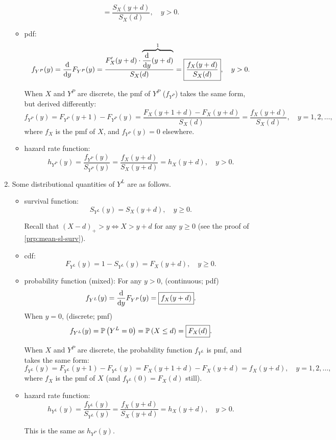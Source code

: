 \begin{enumerate}
\begin{itemize}
\[=\boxed{\frac{S_X(y+d)}{S_X(d)}},\quad y>0.
\]
\item pdf:
\[
f_{Y^P}(y)=\dv{}{y}F_{Y^P}(y)
=\frac{\displaystyle F_X'(y+d)\cdot\overbrace{\dv{}{y}{(y+d)}}^{1}}{S_X(d)}
=\boxed{\frac{f_X(y+d)}{S_X(d)}},\quad y>0.
\]
\begin{note}
When \(X\) and \(Y^P\) are discrete, the pmf of \(Y^P\) (\(f_{Y^P}\)) takes the
same form, but derived differently:
\[
f_{Y^P}(y)=F_{Y^P}(y+1)-F_{Y^P}(y)
=\frac{F_X(y+1+d)-F_X(y+d)}{S_X(d)}
=\frac{f_X(y+d)}{S_X(d)},\quad y=1,2,\dotsc,
\]
where \(f_X\) is the pmf of \(X\), and \(f_{Y^P}(y)=0\) elsewhere.
\end{note}
\item hazard rate function:
\[
h_{Y^P}(y)=\frac{f_{Y^P}(y)}{S_{Y^P}(y)}=\frac{f_X(y+d)}{S_X(y+d)}=\boxed{h_X(y+d)},\quad y>0.
\]
\end{itemize}

\item \label{it:yl-dist-quantities}
Some distributional quantities of \(Y^L\) are as follows.
\begin{itemize}
\item survival function:
\[
S_{Y^L}(y)=
\boxed{S_X(y+d)}, \quad y\ge 0.
\]
\begin{note}
Recall that \((X-d)_{+}>y\iff X>y+d\) for any \(y\ge 0\) (see the proof of
\cref{prp:mean-sl-surv}).
\end{note}
\item cdf: \[
F_{Y^L}(y)=1-S_{Y^L}(y)=\boxed{F_X(y+d)},\quad y\ge 0.
\]
\item probability function (mixed): For any \(y>0\), (continuous; pdf)
\[
f_{Y^L}(y)=\dv{}{y}F_{Y^P}(y)
=\boxed{f_X(y+d)}.
\]
When \(y=0\), (discrete; pmf)
\[
f_{Y^L}(y)=\mathbb{P}\left(Y^L=0\right)=\mathbb{P}\left(X\le d\right)=\boxed{F_X(d)}.
\]
\begin{note}
When \(X\) and \(Y^P\) are discrete, the probability function \(f_{Y^L}\) is
pmf, and takes the same form:
\[
f_{Y^L}(y)=F_{Y^L}(y+1)-F_{Y^L}(y)
=F_X(y+1+d)-F_X(y+d)
=f_X(y+d),\quad y=1,2,\dotsc,
\]
where \(f_X\) is the pmf of \(X\) (and \(f_{Y^L}(0)=F_X(d)\) still).
\end{note}
\item hazard rate function:
\[
h_{Y^L}(y)=\frac{f_{Y^L}(y)}{S_{Y^L}(y)}=\frac{f_X(y+d)}{S_X(y+d)}=\boxed{h_X(y+d)},\quad y>0.
\]
\begin{note}
This is the same as \(h_{Y^P}(y)\).
\end{note}
\end{itemize}


\end{enumerate}
